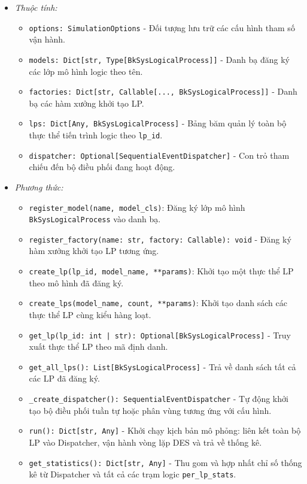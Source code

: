 \begin{itemize}[leftmargin=1.5em, itemsep=8pt]
\begin{itemize}[leftmargin=1.2em, label={}, itemsep=3pt]
\item[\textendash] \textit{Thuộc tính:}
\begin{itemize}[leftmargin=1.5em, label=+, itemsep=2pt]
\item \texttt{options: SimulationOptions} - Đối tượng lưu trữ các cấu hình tham số vận hành.
\item \texttt{models: Dict[str, Type[BkSysLogicalProcess]]} - Danh bạ đăng ký các lớp mô hình logic theo tên.
\item \texttt{factories: Dict[str, Callable[..., BkSysLogicalProcess]]} - Danh bạ các hàm xưởng khởi tạo LP.
\item \texttt{lps: Dict[Any, BkSysLogicalProcess]} - Bảng băm quản lý toàn bộ thực thể tiến trình logic theo \texttt{lp\_id}.
\item \texttt{dispatcher: Optional[SequentialEventDispatcher]} - Con trỏ tham chiếu đến bộ điều phối đang hoạt động.
\end{itemize}

\item[\textendash] \textit{Phương thức:}
\begin{itemize}[leftmargin=1.5em, label=+, itemsep=2pt]
\item \texttt{register\_model(name, model\_cls)}: Đăng ký lớp mô hình \texttt{BkSysLogicalProcess} vào danh bạ.
\item \texttt{register\_factory(name: str, factory: Callable): void} - Đăng ký hàm xưởng khởi tạo LP tương ứng.
\item \texttt{create\_lp(lp\_id, model\_name, **params)}: Khởi tạo một thực thể LP theo mô hình đã đăng ký.
\item \texttt{create\_lps(model\_name, count, **params)}: Khởi tạo danh sách các thực thể LP cùng kiểu hàng loạt.
\item \texttt{get\_lp(lp\_id: int | str): Optional[BkSysLogicalProcess]} - Truy xuất thực thể LP theo mã định danh.
\item \texttt{get\_all\_lps(): List[BkSysLogicalProcess]} - Trả về danh sách tất cả các LP đã đăng ký.
\item \texttt{\_create\_dispatcher(): SequentialEventDispatcher} - Tự động khởi tạo bộ điều phối tuần tự hoặc phân vùng tương ứng với cấu hình.
\item \texttt{run(): Dict[str, Any]} - Khởi chạy kịch bản mô phỏng: liên kết toàn bộ LP vào Dispatcher, vận hành vòng lặp DES và trả về thống kê.
\item \texttt{get\_statistics(): Dict[str, Any]} - Thu gom và hợp nhất chỉ số thống kê từ Dispatcher và tất cả các trạm logic \texttt{per\_lp\_stats}.
\end{itemize}
\end{itemize}
\end{itemize}

